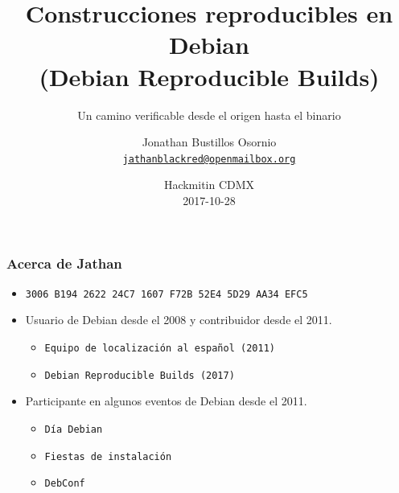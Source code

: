 \documentclass[14pt,aspectratio=169]{beamer}
\title[Reproducible Builds]{Construcciones reproducibles en Debian\\
(Debian Reproducible Builds)}
\subtitle{Un camino verificable desde el origen hasta el binario}
\author[Jathan]{%
   \texorpdfstring{
            Jonathan Bustillos Osornio\\
            \href{mailto:jathanblackred@openmailbox.org}{\texttt{jathanblackred@openmailbox.org}}
   }{Jathan}}
\institute[Debian]{}
\date[Hackmitin CDMX 2017]{%
 Hackmitin CDMX\\
 \small
 2017-10-28}
\begin{document}
\begin{frame}
\titlepage
\end{frame}

\begin{frame}
 \frametitle{Acerca de Jathan}

 \begin{itemize}
  \item \small{\texttt{3006 B194 2622 24C7 1607 F72B 52E4 5D29 AA34 EFC5}}
  \item Usuario de Debian desde el 2008 y contribuidor desde el 2011.
    \begin{itemize}
    \item \texttt{Equipo de localización al español (2011)}
    \item \texttt{Debian Reproducible Builds (2017)}
   \end{itemize}   
  \item Participante en algunos eventos de Debian desde el 2011.
   \begin{itemize}
    \item \texttt{Día Debian}
    \item \texttt{Fiestas de instalación}
    \item \texttt{DebConf}
   \end{itemize}
 \end{itemize}
\end{frame}
\end{document}

